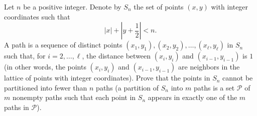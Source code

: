 Let $n$ be a positive integer. Denote by $S_n$ the set of points $(x, y)$ with integer coordinates such that \[ \left\lvert x\right\rvert + \left\lvert y + \frac{1}{2} \right\rvert < n. \] A path is a sequence of distinct points $(x_1 , y_1), (x_2, y_2), \ldots, (x_\ell, y_\ell)$ in $S_n$ such that, for $i = 2, \ldots, \ell$,  the distance between $(x_i , y_i)$ and $(x_{i-1} , y_{i-1} )$ is $1$ (in other words, the points $(x_i, y_i)$ and $(x_{i-1} , y_{i-1} )$ are neighbors in the lattice of points with integer coordinates). Prove that the points in $S_n$ cannot be partitioned into fewer than $n$ paths (a partition of $S_n$ into $m$ paths is a set $\mathcal{P}$ of $m$ nonempty paths such that each point in $S_n$ appears in exactly one of the $m$ paths in $\mathcal{P}$).